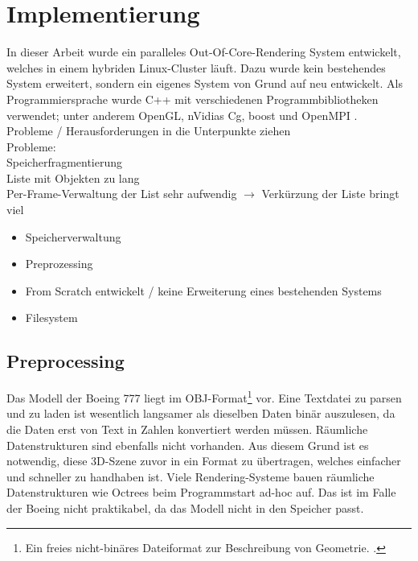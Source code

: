 
\chapter{Implementierung}
\label{chap:impl}

In dieser Arbeit wurde ein paralleles Out-Of-Core-Rendering System entwickelt, welches in einem hybriden Linux-Cluster läuft. Dazu wurde kein bestehendes System erweitert, sondern ein eigenes System von Grund auf neu entwickelt. Als Programmiersprache wurde C++ mit verschiedenen Programmbibliotheken verwendet; unter anderem OpenGL, nVidias Cg, boost und OpenMPI \cite{mpi}. \\
Probleme / Herausforderungen in die Unterpunkte ziehen\\
Probleme:\\
Speicherfragmentierung\\
Liste mit Objekten zu lang\\
Per-Frame-Verwaltung der List sehr aufwendig $\rightarrow$ Verkürzung der Liste bringt viel
\begin{itemize}
 \item Speicherverwaltung
 \item Preprozessing
 \item From Scratch entwickelt / keine Erweiterung eines bestehenden Systems
 \item Filesystem
\end{itemize}

\section{Preprocessing}
\label{sec:impl:preprocessing}
Das Modell der Boeing 777 liegt im OBJ-Format\footnote{Ein freies nicht-binäres Dateiformat zur Beschreibung von Geometrie. \cite{obj}. } vor. Eine Textdatei zu parsen und zu laden ist wesentlich langsamer als dieselben Daten binär auszulesen, da die Daten erst von Text in Zahlen konvertiert werden müssen. Räumliche Datenstrukturen sind ebenfalls nicht vorhanden. Aus diesem Grund ist es notwendig, diese 3D-Szene zuvor in ein Format zu übertragen, welches einfacher und schneller zu handhaben ist. Viele Rendering-Systeme bauen räumliche Datenstrukturen wie Octrees beim Programmstart ad-hoc auf. Das ist im Falle der Boeing nicht praktikabel, da das Modell nicht in den Speicher passt.

